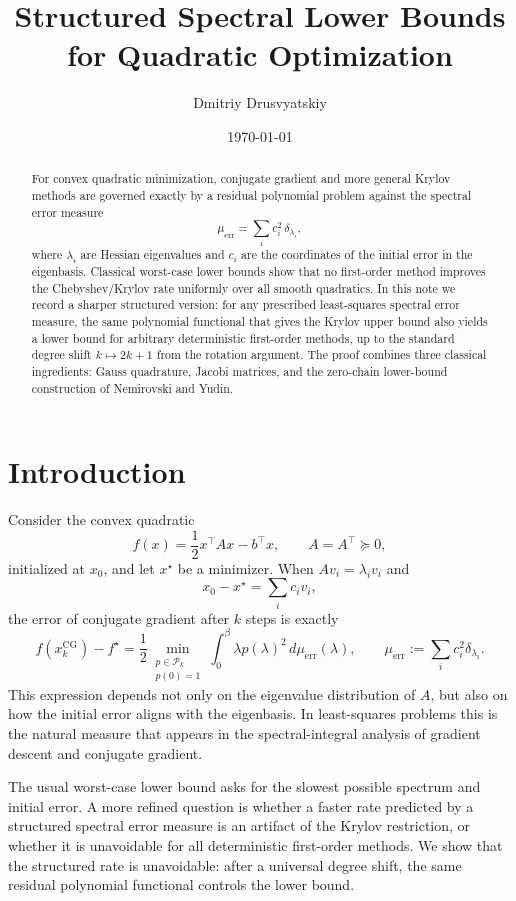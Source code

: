 \documentclass[11pt]{article}
\title{Structured Spectral Lower Bounds for Quadratic Optimization}
\author{Dmitriy Drusvyatskiy}
\date{\today}
\theoremstyle{definition}
\newcommand{\Pcal}{\mathcal{P}}
\begin{document}
\maketitle

\begin{abstract}
For convex quadratic minimization, conjugate gradient and more general
Krylov methods are governed exactly by a residual polynomial problem against
the spectral error measure
\[
  \mu_{\mathrm{err}}=\sum_i c_i^2\,\delta_{\lambda_i},
\]
where \(\lambda_i\) are Hessian eigenvalues and \(c_i\) are the coordinates
of the initial error in the eigenbasis.  Classical worst-case lower bounds
show that no first-order method improves the Chebyshev/Krylov rate uniformly
over all smooth quadratics.  In this note we record a sharper structured
version: for any prescribed least-squares spectral error measure, the same
polynomial functional that gives the Krylov upper bound also yields a lower
bound for arbitrary deterministic first-order methods, up to the standard
degree shift \(k\mapsto 2k+1\) from the rotation argument.  The proof combines
three classical ingredients: Gauss quadrature, Jacobi matrices, and the
zero-chain lower-bound construction of Nemirovski and Yudin.
\end{abstract}

\section{Introduction}

Consider the convex quadratic
\[
  f(x)=\frac12 x^\top A x-b^\top x,
  \qquad A=A^\top\succeq 0,
\]
initialized at \(x_0\), and let \(x^\star\) be a minimizer.  When
\(A v_i=\lambda_i v_i\) and
\[
  x_0-x^\star=\sum_i c_i v_i,
\]
the error of conjugate gradient after \(k\) steps is exactly
\[
  f(x_k^{\mathrm{CG}})-f^\star
  =
  \frac12
  \min_{\substack{p\in\Pcal_k\\p(0)=1}}
  \int_0^\beta \lambda p(\lambda)^2\,d\mu_{\mathrm{err}}(\lambda),
  \qquad
  \mu_{\mathrm{err}}:=\sum_i c_i^2\delta_{\lambda_i}.
  \tag{1}
\]
This expression depends not only on the eigenvalue distribution of \(A\), but
also on how the initial error aligns with the eigenbasis.  In least-squares
problems this is the natural measure that appears in the spectral-integral
analysis of gradient descent and conjugate gradient.

The usual worst-case lower bound asks for the slowest possible spectrum and
initial error.  A more refined question is whether a faster rate predicted by
a structured spectral error measure is an artifact of the Krylov restriction,
or whether it is unavoidable for all deterministic first-order methods.  We
show that the structured rate is unavoidable: after a universal degree shift,
the same residual polynomial functional controls the lower bound.
\end{document}
